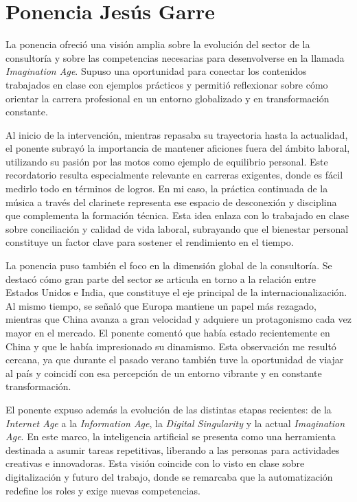 \chapter{Ponencia Jesús Garre}

La ponencia ofreció una visión amplia sobre la evolución del sector de la consultoría y sobre las competencias necesarias para desenvolverse en la llamada \emph{Imagination Age}. Supuso una oportunidad para conectar los contenidos trabajados en clase con ejemplos prácticos y permitió reflexionar sobre cómo orientar la carrera profesional en un entorno globalizado y en transformación constante.  

Al inicio de la intervención, mientras repasaba su trayectoria hasta la actualidad, el ponente subrayó la importancia de mantener aficiones fuera del ámbito laboral, utilizando su pasión por las motos como ejemplo de equilibrio personal. Este recordatorio resulta especialmente relevante en carreras exigentes, donde es fácil medirlo todo en términos de logros. En mi caso, la práctica continuada de la música a través del clarinete representa ese espacio de desconexión y disciplina que complementa la formación técnica. Esta idea enlaza con lo trabajado en clase sobre conciliación y calidad de vida laboral, subrayando que el bienestar personal constituye un factor clave para sostener el rendimiento en el tiempo.  

La ponencia puso también el foco en la dimensión global de la consultoría. Se destacó cómo gran parte del sector se articula en torno a la relación entre Estados Unidos e India, que constituye el eje principal de la internacionalización. Al mismo tiempo, se señaló que Europa mantiene un papel más rezagado, mientras que China avanza a gran velocidad y adquiere un protagonismo cada vez mayor en el mercado. El ponente comentó que había estado recientemente en China y que le había impresionado su dinamismo. Esta observación me resultó cercana, ya que durante el pasado verano también tuve la oportunidad de viajar al país y coincidí con esa percepción de un entorno vibrante y en constante transformación.  

El ponente expuso además la evolución de las distintas etapas recientes: de la \emph{Internet Age} a la \emph{Information Age}, la \emph{Digital Singularity} y la actual \emph{Imagination Age}. En este marco, la inteligencia artificial se presenta como una herramienta destinada a asumir tareas repetitivas, liberando a las personas para actividades creativas e innovadoras. Esta visión coincide con lo visto en clase sobre digitalización y futuro del trabajo, donde se remarcaba que la automatización redefine los roles y exige nuevas competencias.  

